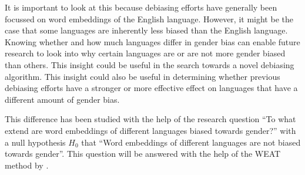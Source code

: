 It is important to look at this
because debiasing
efforts have generally been focussed on word embeddings of the English language.
However, it might be the
case that some languages are inherently less biased than the English language.
Knowing whether and how much languages differ in gender bias
can enable future research to look into why certain languages are or are not
more gender biased than others. This insight could be useful in the search towards a novel
debiasing algorithm. This insight could also be useful in determining whether previous
debiasing efforts have a stronger or more effective effect on languages that have
a different amount of gender bias.

This difference has been studied with the help of the research
question ``To what extend are word
embeddings of different languages biased towards gender?'' with a null hypothesis $H_0$
that ``Word embeddings of different languages are not biased towards gender''.
This question will be answered with the help of the WEAT method by
\textcite{caliskan_2017_semantics_language_corpora}.

